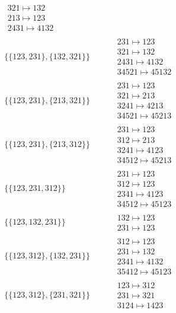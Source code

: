\begin{tiny}
\begin{align}
\begin{matrix}
321 \mapsto 132\\213 \mapsto 123\\2431 \mapsto 4132
\end{matrix}
\\
\{\{123, 231\}, \{132, 321\}\}
\quad
&
\phantom{.}
&
\begin{matrix}
231 \mapsto 123\\321 \mapsto 132\\2431 \mapsto 4132\\34521 \mapsto 45132
\end{matrix}
\\
\{\{123, 231\}, \{213, 321\}\}
\quad
&
\phantom{.}
&
\begin{matrix}
231 \mapsto 123\\321 \mapsto 213\\3241 \mapsto 4213\\34521 \mapsto 45213
\end{matrix}
\\
\{\{123, 231\}, \{213, 312\}\}
\quad
&
\phantom{.}
&
\begin{matrix}
231 \mapsto 123\\312 \mapsto 213\\3241 \mapsto 4123\\34512 \mapsto 45213
\end{matrix}
\\
\{\{123, 231, 312\}\}
\quad
&
\phantom{.}
&
\begin{matrix}
231 \mapsto 123\\312 \mapsto 123\\2341 \mapsto 4123\\34512 \mapsto 45123
\end{matrix}
\\
\{\{123, 132, 231\}\}
\quad
&
\phantom{.}
&
\begin{matrix}
132 \mapsto 123\\231 \mapsto 123
\end{matrix}
\\
\{\{123, 312\}, \{132, 231\}\}
\quad
&
\phantom{.}
&
\begin{matrix}
312 \mapsto 123\\231 \mapsto 132\\2341 \mapsto 4132\\35412 \mapsto 45123
\end{matrix}
\\
\{\{123, 312\}, \{231, 321\}\}
\quad
&
\phantom{.}
&
\begin{matrix}
123 \mapsto 312\\231 \mapsto 321\\3124 \mapsto 1423

\end{matrix}
\end{align}
\end{tiny}
